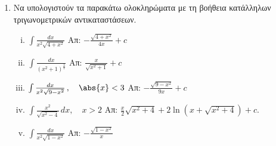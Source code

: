 \begin{enumerate}
  \item Να υπολογιστούν τα παρακάτω ολοκληρώματα με τη βοήθεια κατάλληλων 
    τριγωνομετρικών αντικαταστάσεων.
    \begin{enumerate}[i)]
      \item $\int\frac{dx}{x^2\sqrt{4+x^2}}$ \hfill Απ: $-\frac{\sqrt{4+x^2}}{4x}+c$
      \item $\int\frac{dx}{(x^2+1)^{\frac{3}{2}}}$ \hfill Απ: $\frac{x}{\sqrt{x^2+1}}+c$
      \item $\int\frac{dx}{x^2\sqrt{9-x^2}}\,,\quad \abs{x}<3$ 
        \hfill Απ: $-\frac{\sqrt{9-x^2}}{9x}+c$
      \item $\int\frac{x^2}{\sqrt{x^2-4}}\,dx,\quad x>2$ 
        \hfill Απ: $\frac{x}{2}\sqrt{x^2+4}+2\ln(x+\sqrt{x^2+4})+c$.
      \item $\int \frac{dx}{x^{2}\sqrt{1-x^{2}}}$ \hfill Απ: $-\frac{\sqrt{1-x^{2}}}{x}$
    \end{enumerate}
\end{enumerate}




